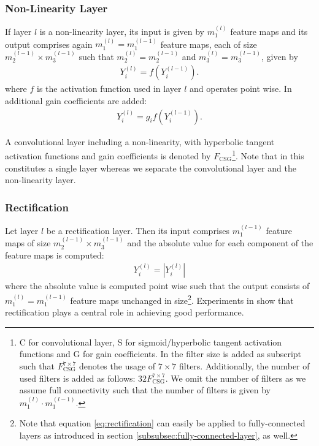\subsubsection{Non-Linearity Layer}
\label{subsubsec:rectification-layer}

If layer $l$ is a non-linearity layer, its input is given by $m_1^{(l)}$ feature maps and its output comprises again $m_1^{(l)} = m_1^{(l-1)}$ feature maps, each of size $m_2^{(l-1)} \times m_3^{(l-1)}$ such that $m_2^{(l)} = m_2^{(l-1)}$ and $m_3^{(l)} = m_3^{(l-1)}$, given by
\begin{align}
	Y_i^{(l)} = f \left(Y_i^{(l-1)}\right).
\end{align}
where $f$ is the activation function used in layer $l$ and operates point wise. In \cite{JarrettKavukcuogluRanzatoLeCun:2009} additional gain coefficients are added:
\begin{align}
	Y_i^{(l)} = g_i f\left(Y_i^{(l-1)}\right).
\end{align}

A convolutional layer including a non-linearity, with hyperbolic tangent activation functions and gain coefficients is denoted by $F_{\text{CSG}}$\footnote{C for convolutional layer, S for sigmoid/hyperbolic tangent activation functions and G for gain coefficients. In \cite{JarrettKavukcuogluRanzatoLeCun:2009} the filter size is added as subscript such that $F_{\text{CSG}}^{7 \times 7}$ denotes the usage of $7 \times 7$ filters. Additionally, the number of used filters is added as follows: $32F_{\text{CSG}}^{7 \times7}$. We omit the number of filters as we assume full connectivity such that the number of filters is given by $m_1^{(l)}\cdot m_1^{(l-1)}$.}. Note that in \cite{JarrettKavukcuogluRanzatoLeCun:2009} this constitutes a single layer whereas we separate the convolutional layer and the non-linearity layer.

\subsubsection{Rectification}

Let layer $l$ be a rectification layer. Then its input comprises $m_1^{(l-1)}$ feature maps of size $m_2^{(l-1)} \times m_3^{(l-1)}$ and the absolute value for each component of the feature maps is computed:
\begin{align}
	\label{eq:rectification}
	Y_i^{(l)} = \left|Y_i^{(l)}\right|
\end{align}
where the absolute value is computed point wise such that the output consists of $m_1^{(l)} = m_1^{(l-1)}$ feature maps unchanged in size\footnote{Note that equation \eqref{eq:rectification} can easily be applied to fully-connected layers as introduced in section \ref{subsubsec:fully-connected-layer}, as well.}. Experiments in \cite{JarrettKavukcuogluRanzatoLeCun:2009} show that rectification plays a central role in achieving good performance.

